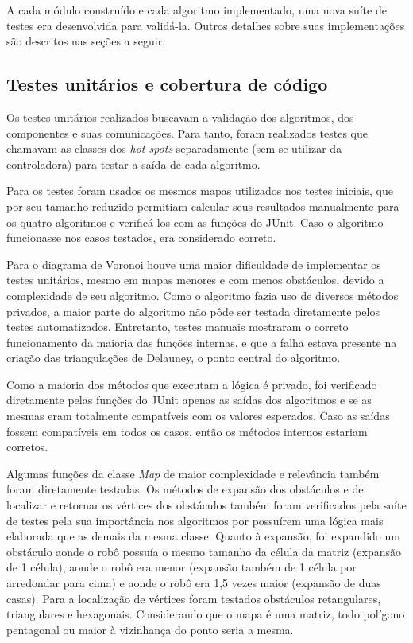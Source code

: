 A cada módulo construído e cada algoritmo implementado, uma nova suíte de testes era desenvolvida para validá-la. Outros detalhes sobre suas implementações são descritos nas seções a seguir.

\subsection{Testes unitários e cobertura de código}

Os testes unitários realizados buscavam a validação dos algoritmos, dos componentes e suas comunicações. Para tanto, foram realizados testes que chamavam as classes dos \textit{hot-spots} separadamente (sem se utilizar da controladora) para testar a saída de cada algoritmo.

Para os testes foram usados os mesmos mapas utilizados nos testes iniciais, que por seu tamanho reduzido permitiam calcular seus resultados manualmente para os quatro algoritmos e verificá-los com as funções do JUnit. Caso o algoritmo funcionasse nos casos testados, era considerado correto.

Para o diagrama de Voronoi houve uma maior dificuldade de implementar os testes unitários, mesmo em mapas menores e com menos obstáculos, devido a complexidade de seu algoritmo. Como o algoritmo fazia uso de diversos métodos privados, a maior parte do algoritmo não pôde ser testada diretamente pelos testes automatizados. Entretanto, testes manuais mostraram o correto funcionamento da maioria das funções internas, e que a falha estava presente na criação das triangulações de Delauney, o ponto central do algoritmo.

Como a maioria dos métodos que executam a lógica é privado, foi verificado diretamente pelas funções do JUnit apenas as saídas dos algoritmos e se as mesmas eram totalmente compatíveis com os valores esperados. Caso as saídas fossem compatíveis em todos os casos, então os métodos internos estariam corretos.

Algumas funções da classe \textit{Map} de maior complexidade e relevância também foram diretamente testadas. Os métodos de expansão dos obstáculos e de localizar e retornar os vértices dos obstáculos também foram verificados pela suíte de testes pela sua importância nos algoritmos por possuírem uma lógica mais elaborada que as demais da mesma classe. Quanto à expansão, foi expandido um obstáculo aonde o robô possuía o mesmo tamanho da célula da matriz (expansão de 1 célula), aonde o robô era menor (expansão também de 1 célula por arredondar para cima) e aonde o robô era 1,5 vezes maior (expansão de duas casas). Para a localização de vértices foram testados obstáculos retangulares, triangulares e hexagonais. Considerando que o mapa é uma matriz, todo polígono pentagonal ou maior à vizinhança do ponto seria a mesma.

